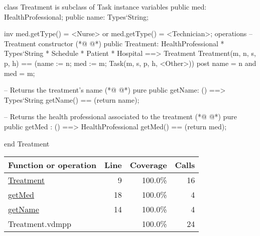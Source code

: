 \begin{vdmpp}[breaklines=true]
class Treatment is subclass of Task
instance variables
  public med: HealthProfessional;
  public name: Types`String;
  
  inv med.getType() = <Nurse> or med.getType() = <Technician>;
operations
 -- Treatment constructor
(*@
\label{Treatment:9}
@*)
 public Treatment: HealthProfessional * Types`String * Schedule * Patient * Hospital ==> Treatment
  Treatment(m, n, s, p, h) == (name := n; med := m; Task(m, s, p, h, <Other>))
 post name = n and med = m;
 
 -- Returns the treatment's name
(*@
\label{getName:14}
@*)
 pure public getName: () ==> Types`String
  getName() == (return name);
 
 -- Returns the health professional associated to the treatment
(*@
\label{getMed:18}
@*)
 pure public getMed : () ==> HealthProfessional
  getMed() == (return med);

end Treatment
\end{vdmpp}
\bigskip
\begin{longtable}{|l|r|r|r|}
\hline
Function or operation & Line & Coverage & Calls \\
\hline
\hline
\hyperref[Treatment:9]{Treatment} & 9&100.0\% & 16 \\
\hline
\hyperref[getMed:18]{getMed} & 18&100.0\% & 4 \\
\hline
\hyperref[getName:14]{getName} & 14&100.0\% & 4 \\
\hline
\hline
Treatment.vdmpp & & 100.0\% & 24 \\
\hline
\end{longtable}

